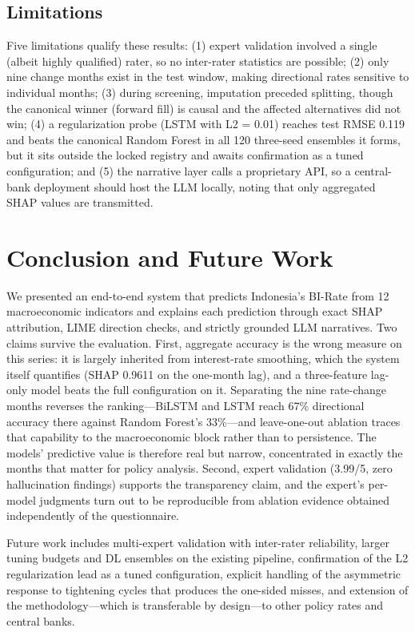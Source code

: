 \documentclass[conference]{IEEEtran}
\begin{document}
\subsection{Limitations}
Five limitations qualify these results: (1) expert validation involved a single (albeit highly qualified) rater, so no inter-rater statistics are possible; (2) only nine change months exist in the test window, making directional rates sensitive to individual months; (3) during screening, imputation preceded splitting, though the canonical winner (forward fill) is causal and the affected alternatives did not win; (4) a regularization probe (LSTM with L2 = 0.01) reaches test RMSE 0.119 and beats the canonical Random Forest in all 120 three-seed ensembles it forms, but it sits outside the locked registry and awaits confirmation as a tuned configuration; and (5) the narrative layer calls a proprietary API, so a central-bank deployment should host the LLM locally, noting that only aggregated SHAP values are transmitted.

\section{Conclusion and Future Work}
We presented an end-to-end system that predicts Indonesia's BI-Rate from 12 macroeconomic indicators and explains each prediction through exact SHAP attribution, LIME direction checks, and strictly grounded LLM narratives. Two claims survive the evaluation. First, aggregate accuracy is the wrong measure on this series: it is largely inherited from interest-rate smoothing, which the system itself quantifies (SHAP 0.9611 on the one-month lag), and a three-feature lag-only model beats the full configuration on it. Separating the nine rate-change months reverses the ranking---BiLSTM and LSTM reach 67\% directional accuracy there against Random Forest's 33\%---and leave-one-out ablation traces that capability to the macroeconomic block rather than to persistence. The models' predictive value is therefore real but narrow, concentrated in exactly the months that matter for policy analysis. Second, expert validation (3.99/5, zero hallucination findings) supports the transparency claim, and the expert's per-model judgments turn out to be reproducible from ablation evidence obtained independently of the questionnaire.

Future work includes multi-expert validation with inter-rater reliability, larger tuning budgets and DL ensembles on the existing pipeline, confirmation of the L2 regularization lead as a tuned configuration, explicit handling of the asymmetric response to tightening cycles that produces the one-sided misses, and extension of the methodology---which is transferable by design---to other policy rates and central banks.
\end{document}
